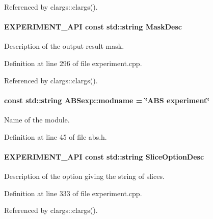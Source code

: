 Referenced by clargs::clargs().

\hypertarget{group__experiment_ga49fc44d3138ced27aa1b626e71399cef}{
\paragraph[{MaskDesc}]{\setlength{\rightskip}{0pt plus 5cm}EXPERIMENT\_\-API const std::string {\bf MaskDesc}}\hfill}
\label{group__experiment_ga49fc44d3138ced27aa1b626e71399cef}


Description of the output result mask. 



Definition at line 296 of file experiment.cpp.



Referenced by clargs::clargs().

\hypertarget{group__experiment_gaabf3821c42c07421c350466c50fca270}{
\paragraph[{modname}]{\setlength{\rightskip}{0pt plus 5cm}const std::string {\bf ABSexp::modname} = \char`\"{}ABS experiment\char`\"{}}\hfill}
\label{group__experiment_gaabf3821c42c07421c350466c50fca270}


Name of the module. 



Definition at line 45 of file abs.h.

\hypertarget{group__experiment_gab69c6d9d77c300fbbfcbde4a0c28eb14}{
\paragraph[{SliceOptionDesc}]{\setlength{\rightskip}{0pt plus 5cm}EXPERIMENT\_\-API const std::string {\bf SliceOptionDesc}}\hfill}
\label{group__experiment_gab69c6d9d77c300fbbfcbde4a0c28eb14}


Description of the option giving the string of slices. 



Definition at line 333 of file experiment.cpp.



Referenced by clargs::clargs().

